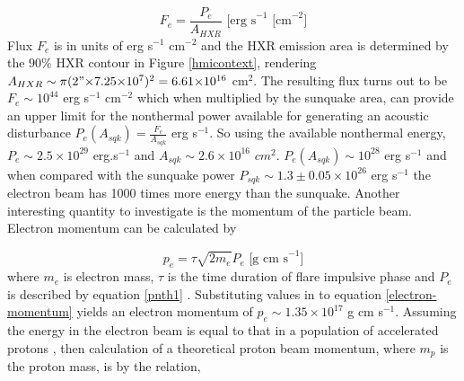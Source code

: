 \begin{equation}\label{electronflux}
F_e = \frac{P_{e}}{A_{HXR}} \text{ [erg s}^{-1}\text{ [cm}^{-2}]
\end{equation}
\noindent
Flux $F_e$ is in units of erg s$^{-1}$ cm$^{-2}$ and the HXR emission area is determined by the $90\%$ HXR contour in Figure \ref{hmicontext}, rendering $A_{HXR} \sim \pi (2"{\times}7.25{\times}10^{7})^{2} = 6.61{\times}10^{16}$ cm$^{2}$. The resulting flux turns out to be $F_e \sim 10^{44}$ erg s$^{-1}$ cm$^{-2}$ which when multiplied by the sunquake area, can provide an upper limit for the nonthermal power available for generating an acoustic disturbance $P_{e}(A_{sqk}) = \frac{F_e}{A_{sqk}}$ erg s$^{-1}$. So using the available nonthermal energy, $P_e \sim 2.5{\times}10^{29}$ erg.s$^{-1}$ and $A_{sqk} \sim 2.6{\times}10^{16}$ $cm^{2}$. $P_{e}(A_{sqk}) \sim 10^{28}$ erg s$^{-1}$ and when compared with the sunquake power $P_{sqk} \sim 1.3\pm0.05{\times}10^{26}$ erg s$^{-1}$ the electron beam has 1000 times more energy than the sunquake. Another interesting quantity to investigate is the momentum of the particle beam. Electron momentum can be calculated by 


\begin{equation}\label{electron-momentum}
p_e=\tau \sqrt{2m_e} P_{e} \text{ [g cm s}^{-1}]
\end{equation}
\noindent
where $m_e$ is electron mass, $\tau$ is the time duration of flare impulsive phase and $P_{e}$ is described by equation \ref{pnth1} \citep{2015ApJ...807..102S}. Substituting values in to equation \ref{electron-momentum} yields an electron momentum of $p_e \sim 1.35{\times}10^{17}$ g cm s$^{-1}$. Assuming the energy in the electron beam is equal to that in a population of accelerated protons \citep{2000ApJ...542..513E}, then calculation of a theoretical proton beam momentum, where $m_p$ is the proton mass, is by the relation,

